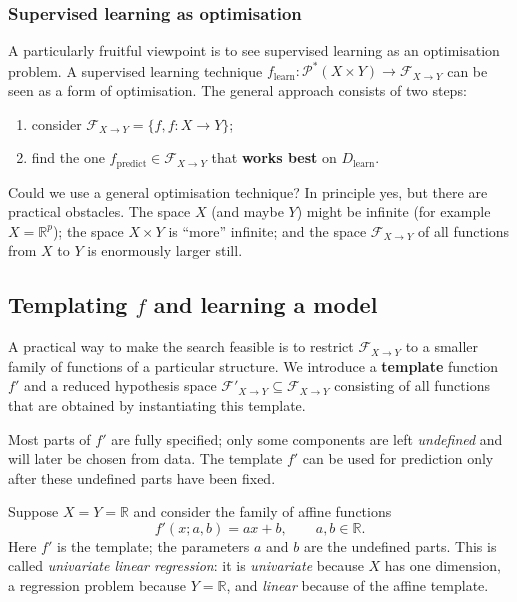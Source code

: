 \vspace{-0.3em}

\subsubsection{Supervised learning as optimisation}

A particularly fruitful viewpoint is to see supervised learning as an optimisation problem. A supervised learning technique $f_{\text{learn}} \colon \mathcal{P}^{*}(X \times Y) \to \mathcal{F}_{X \to Y}$ can be seen as a form of optimisation. The general approach consists of two steps:
\begin{enumerate}
  \item consider $\mathcal{F}_{X \to Y} = \{ f, f \colon X \to Y \}$;
  \item find the one $f_{\text{predict}} \in \mathcal{F}_{X \to Y}$ that \textbf{works best} on $D_{\text{learn}}$.
\end{enumerate}

Could we use a general optimisation technique? In principle yes, but there are practical obstacles. The space $X$ (and maybe $Y$) might be infinite (for example $X = \mathbb{R}^{p}$); the space $X \times Y$ is ``more'' infinite; and the space $\mathcal{F}_{X \to Y}$ of all functions from $X$ to $Y$ is enormously larger still.

\vspace{-0.5em}

\subsection*{Templating $f$ and learning a model}

A practical way to make the search feasible is to restrict $\mathcal{F}_{X \to Y}$ to a smaller family of functions of a particular structure. We introduce a \textbf{template} function $f'$ and a reduced hypothesis space $\mathcal{F}'_{X \to Y} \subseteq \mathcal{F}_{X \to Y}$ consisting of all functions that are obtained by instantiating this template.

Most parts of $f'$ are fully specified; only some components are left \emph{undefined} and will later be chosen from data. The template $f'$ can be used for prediction only after these undefined parts have been fixed.

\begin{exampleblock}
Suppose $X = Y = \mathbb{R}$ and consider the family of affine functions
$$
f'(x; a, b) = ax + b, \qquad a, b \in \mathbb{R}.
$$
Here $f'$ is the template; the parameters $a$ and $b$ are the undefined parts. This is called \emph{univariate linear regression}: it is \emph{univariate} because $X$ has one dimension, a regression problem because $Y = \mathbb{R}$, and \emph{linear} because of the affine template.
\end{exampleblock}

